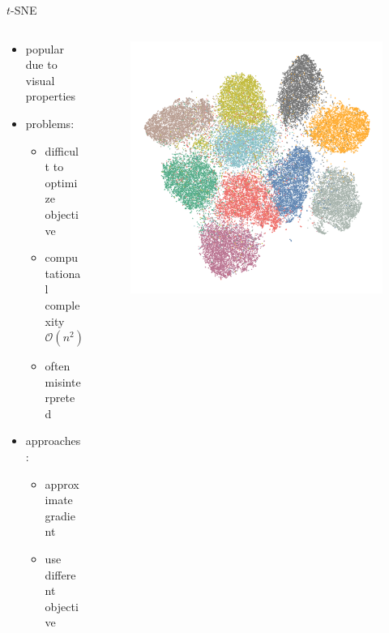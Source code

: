 \documentclass{beamer}
\begin{document}
\begin{frame}[fragile]{$t$-SNE}
    \begin{columns}
    \begin{column}{0.6\textwidth}
        \begin{itemize}
            \item popular due to visual properties
            \item problems:
                \begin{itemize}
                    \item difficult to optimize objective
                    \item computational complexity $\mathcal{O}(n^2)$
                    \item often misinterpreted
                \end{itemize}
            \item approaches:
                \begin{itemize}
                    \item approximate gradient
                    \item use different objective
                \end{itemize}
        \end{itemize}
    \end{column}
    \begin{column}{0.38\textwidth}
        \begin{figure}[h]
            \centering
            \includegraphics[width=\textwidth]{tsne_emb_cifar}
        \end{figure}
    \end{column}
\end{columns}
\end{frame}
\end{document}
